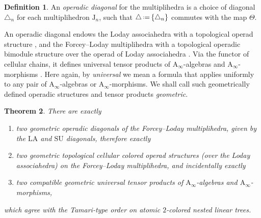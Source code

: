 \documentclass{amsart}
\newcommand{\darkblue}{\color{darkblue}} %
\newtheorem{theorem}{Theorem}[section]
\theoremstyle{definition}
\newtheorem{definition}[theorem]{Definition}
\newcommand{\J}{\mathrm{J}} %
\newcommand{\eqdef}{\mbox{\,\raisebox{0.2ex}{\scriptsize\ensuremath{\mathrm:}}\ensuremath{=}\,}} %
\newcommand{\defn}[1]{\textsl{\darkblue #1}} %
\newcommand{\SU}{\mathrm{SU}}
\newcommand{\LA}{\mathrm{LA}}
\newcommand{\Ainf}{\ensuremath{\mathrm{A}_\infty}}
\begin{document}
\begin{definition}
	An \defn{operadic diagonal} for the multiplihedra is a choice of diagonal $\triangle_n$ for each multiplihedron $\J_n$, such that $\triangle \eqdef \{\triangle_n\}$ commutes with the map $\Theta$.
\end{definition}

An operadic diagonal endows the Loday associahedra with a topological operad structure \cite[Thm.~1]{MasudaThomasTonksVallette}, and the Forcey--Loday multiplihedra with a topological operadic bimodule structure over the operad of Loday associahedra \cite[Thm.~1]{LaplanteAnfossiMazuir}.
Via the functor of cellular chains, it defines universal tensor products of $\Ainf$-algebras and $\Ainf$-morphisms \cite[Sec.~4.2.1]{LaplanteAnfossiMazuir}.
Here again, by \emph{universal} we mean a formula that applies uniformly to any pair of $\Ainf$-algebras or $\Ainf$-morphisms.
We shall call such geometrically defined operadic structures and tensor products \emph{geometric}. 

\begin{theorem}
\label{thm:multiplihedra}
There are exactly 
\begin{enumerate}
\item two geometric operadic diagonals of the Forcey--Loday multiplihedra, given by the $\LA$ and $\SU$ diagonals, therefore exactly
\item two geometric topological cellular colored operad structures (over the Loday associahedra) on the Forcey--Loday multiplihedra, and incidentally exactly
\item two compatible geometric universal tensor products of $\Ainf$-algebras and $\Ainf$-morphisms,
\end{enumerate}
which agree with the Tamari-type order on atomic $2$-colored nested linear trees. 
\end{theorem}
\end{document}
